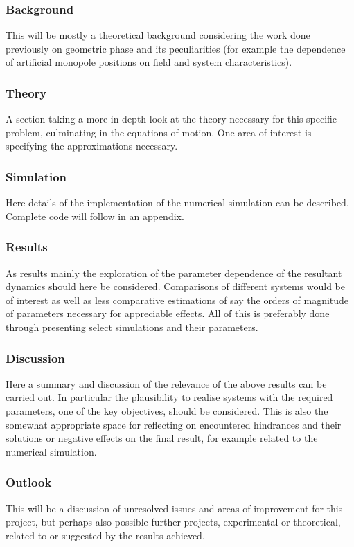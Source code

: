 \documentclass [a4paper]{article}
\begin{document}
\subsubsection*{Background}
This will be mostly a theoretical background considering the work done previously on
geometric phase and its peculiarities (for example the dependence of artificial monopole positions on
field and system characteristics).
\subsubsection*{Theory}
A section taking a more in depth look at the theory necessary for this specific problem, culminating in the
equations of motion. One area of interest is specifying the approximations
necessary.
\subsubsection*{Simulation}
Here details of the implementation of the numerical simulation can be described. Complete
code will follow in an appendix.
\subsubsection*{Results}
As results mainly the exploration of the parameter dependence of the resultant dynamics
should here be considered. Comparisons of different systems would be of interest as well as
less comparative estimations of say the orders of magnitude of parameters necessary for
appreciable effects. All of this is preferably done through presenting select simulations
and their parameters.
\subsubsection*{Discussion}
Here a summary and discussion of the relevance of the above results can be carried out. In
particular the plausibility to realise systems with the required parameters, one of the key
objectives, should be considered. This is also the somewhat appropriate space for
reflecting on encountered hindrances and their solutions or negative effects on the final
result, for example related to the numerical simulation.
\subsubsection*{Outlook}
This will be a discussion of unresolved issues and areas of improvement for this project,
but perhaps also possible further projects, experimental or theoretical, related to or suggested by the results achieved.
\end{document}
